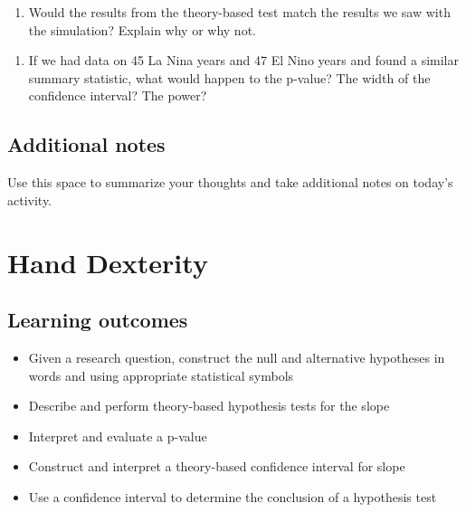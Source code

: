 \documentclass[
]{report}
\providecommand{\tightlist}{%
  \setlength{\itemsep}{0pt}\setlength{\parskip}{0pt}}
\begin{document}
\begin{enumerate}
\def\labelenumi{\arabic{enumi}.}
\setcounter{enumi}{19}
\tightlist
\item
  Would the results from the theory-based test match the results we saw with the simulation? Explain why or why not.
\end{enumerate}

\vspace{1in}

\begin{enumerate}
\def\labelenumi{\arabic{enumi}.}
\setcounter{enumi}{20}
\tightlist
\item
  If we had data on 45 La Nina years and 47 El Nino years and found a similar summary statistic, what would happen to the p-value? The width of the confidence interval? The power?
\end{enumerate}

\vspace{1in}

\hypertarget{additional-notes}{%
\section{Additional notes}\label{additional-notes}}

Use this space to summarize your thoughts and take additional notes on today's activity.

\hypertarget{hand-dexterity}{%
\chapter{Hand Dexterity}\label{hand-dexterity}}

\hypertarget{learning-outcomes}{%
\section{Learning outcomes}\label{learning-outcomes}}

\begin{itemize}
\item
  Given a research question, construct the null and alternative hypotheses
  in words and using appropriate statistical symbols
\item
  Describe and perform theory-based hypothesis tests for the slope
\item
  Interpret and evaluate a p-value
\item
  Construct and interpret a theory-based confidence interval for slope
\item
  Use a confidence interval to determine the conclusion of a hypothesis test
\end{itemize}
\end{document}
